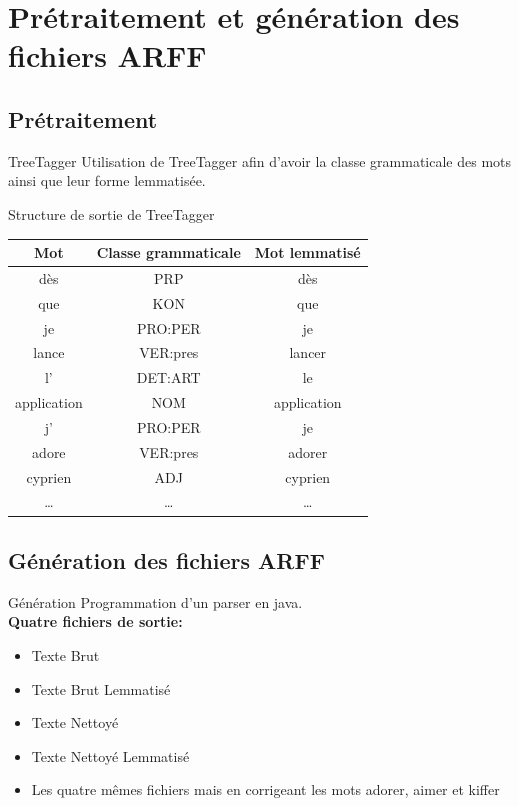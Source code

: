 \documentclass{beamer}
\begin{document}
\section{Prétraitement et génération des fichiers ARFF}
\subsection{Prétraitement}
\begin{frame}
	\begin{block}{TreeTagger}
		Utilisation de TreeTagger afin d'avoir la classe grammaticale des mots ainsi que leur forme lemmatisée.
	\end{block}
	
\end{frame}

\begin{frame}
\begin{exampleblock}{Structure de sortie de TreeTagger}
			\centering
			 \begin{tabular}{|c|c|c|}
					\hline
					Mot&Classe grammaticale&Mot lemmatisé\\
					\hline
					dès&PRP&dès\\
					que&KON&que\\
					je&PRO:PER&je\\
					lance&VER:pres&lancer\\
					l'&DET:ART&le\\
					application&NOM&application\\
					j'&PRO:PER&je\\
					adore&VER:pres&adorer\\
					cyprien&ADJ&cyprien\\
					\dots&\dots&\dots\\
					\hline
			 \end{tabular}
	\end{exampleblock}

\end{frame}

\subsection{Génération des fichiers ARFF}
\begin{frame}
	\begin{block}{Génération}
		Programmation d'un parser en java.\\
		
		\textbf{Quatre fichiers de sortie:}
		\begin{itemize}
			\item Texte Brut
			\item Texte Brut Lemmatisé
			\item Texte Nettoyé
			\item Texte Nettoyé Lemmatisé
			\item Les quatre mêmes fichiers mais en corrigeant les mots adorer, aimer et kiffer
		\end{itemize}
	\end{block}
\end{frame}
\end{document}
